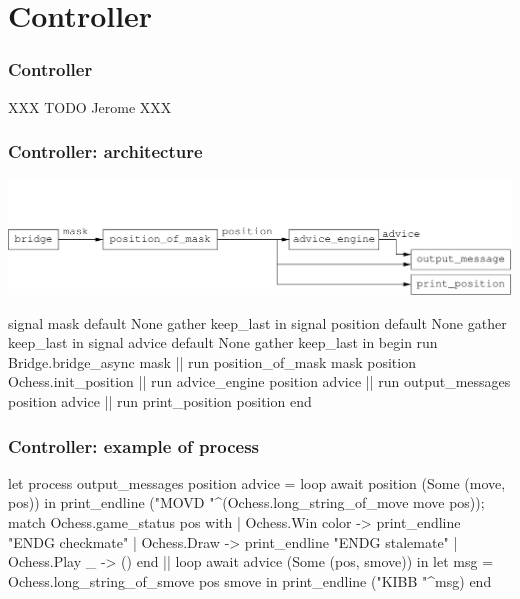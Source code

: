 \documentclass[t]{beamer}
\begin{document}
\section{Controller}

\begin{frame}[fragile]
\frametitle{Controller}

XXX TODO Jerome XXX

\end{frame}


\begin{frame}[fragile]
\frametitle{Controller: architecture}

\includegraphics[scale=0.6]{figures/controller}

\pause

\begin{lstrml}
  signal mask default None gather keep_last in
  signal position default None gather keep_last in
  signal advice default None gather keep_last in
  begin
    run Bridge.bridge_async mask ||
    run position_of_mask mask position Ochess.init_position ||
    run advice_engine position advice ||
    run output_messages position advice ||
    run print_position position
  end
\end{lstrml}

\end{frame}


\begin{frame}[fragile]
\frametitle{Controller: example of process}

\begin{lstrml}
let process output_messages position advice =
  loop
    await position (Some (move, pos)) in
    print_endline ("MOVD "^(Ochess.long_string_of_move move pos));
    match Ochess.game_status pos with
    | Ochess.Win color -> print_endline "ENDG checkmate"
    | Ochess.Draw -> print_endline "ENDG stalemate"
    | Ochess.Play _ -> ()
  end
  ||
  loop
    await advice (Some (pos, smove)) in
    let msg = Ochess.long_string_of_smove pos smove in
    print_endline ("KIBB "^msg)
  end
\end{lstrml}

\end{frame}
\end{document}
